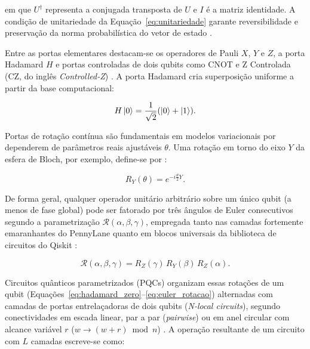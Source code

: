 \documentclass[
    12pt,
    openright,
    oneside,
    a4paper,
    english,
    brazil
]{abntex2}
\begin{document}
em que \(U^\dagger\) representa a conjugada transposta de \(U\) e \(I\) é a matriz identidade. A condição de unitariedade da Equação~\eqref{eq:unitariedade} garante reversibilidade e preservação da norma probabilística do vetor de estado \cite{nielsen2010quantum}.

Entre as portas elementares destacam-se os operadores de Pauli \(X\), \(Y\) e \(Z\), a porta Hadamard \(H\) e portas controladas de dois qubits como CNOT e Z Controlada (CZ, do inglês \textit{Controlled-Z}) \cite{nielsen2010quantum}. A porta Hadamard cria superposição uniforme a partir da base computacional:

\begin{equation}
\label{eq:hadamard_zero}
H\ket{0} =
\frac{1}{\sqrt{2}}
(\ket{0} + \ket{1}).
\end{equation}

Portas de rotação contínua são fundamentais em modelos variacionais por dependerem de parâmetros reais ajustáveis \(\theta\). Uma rotação em torno do eixo \(Y\) da esfera de Bloch, por exemplo, define-se por \cite{nielsen2010quantum,cerezo2021variational}:

\begin{equation}
\label{eq:rotacao_ry}
R_Y(\theta) =
e^{-i\frac{\theta}{2}Y}.
\end{equation}

De forma geral, qualquer operador unitário arbitrário sobre um único qubit (a menos de fase global) pode ser fatorado por três ângulos de Euler consecutivos segundo a parametrização \(\mathcal{R}(\alpha,\beta,\gamma)\), empregada tanto nas camadas fortemente emaranhantes do PennyLane quanto em blocos universais da biblioteca de circuitos do Qiskit \cite{nielsen2010quantum,bergholm2018pennylane,pennylaneDocsSEL2026,ibmQuantumCircuitLibrary2026}:

\begin{equation}
\label{eq:euler_rotacao}
\mathcal{R}(\alpha,\beta,\gamma) = R_Z(\gamma)\,R_Y(\beta)\,R_Z(\alpha).
\end{equation}

Circuitos quânticos parametrizados (PQCs) organizam essas rotações de um qubit (Equações~\eqref{eq:hadamard_zero}--\eqref{eq:euler_rotacao}) alternadas com camadas de portas entrelaçadoras de dois qubits (\textit{N-local circuits}), segundo conectividades em escada linear, par a par (\textit{pairwise}) ou em anel circular com alcance variável \(r\) (\(w \to (w+r)\bmod n\)) \cite{cerezo2021variational,pennylaneDocsSEL2026,ibmQuantumCircuitLibrary2026}. A operação resultante de um circuito com \(L\) camadas escreve-se como:
\end{document}
